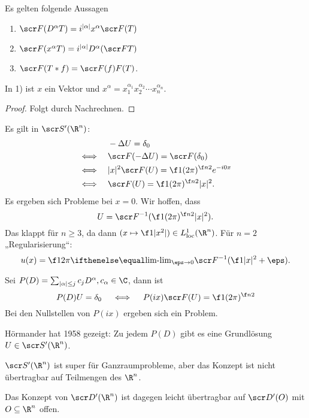 \begin{st} \label{5.60}
	Es gelten folgende Aussagen
	\begin{enumerate}[1)]
		\item
			$\scr F(D^\alpha T) = i^{|\alpha|} x^\alpha \scr F(T)$
		\item
			$\scr F(x^\alpha T) = i^{|\alpha|} D^\alpha (\scr FT)$
		\item
			$\scr F(T \ast f) = \scr F(f) F(T)$.
	\end{enumerate}
	\begin{note}
		In 1) ist $x$ ein Vektor und $x^\alpha = x_1^{\alpha_1} x_2^{\alpha_2} \dotsb x_n^{\alpha_n}$.
	\end{note}
	\begin{proof}
		Folgt durch Nachrechnen.
	\end{proof}
\end{st}

\begin{ex} \label{5.61}
	Es gilt in $\scr S'(\R^n)$:
	\begin{align*}
		&\quad - \Delta U = \delta_0 \\
		\iff&\quad \scr F(-\Delta U) = \scr F(\delta_0) \\
		\iff&\quad |x|^2 \scr F(U) = \f 1{(2\pi)^{\f n2}} e^{-i 0 x} \\
		\iff&\quad \scr F(U) = \f 1{(2\pi)^{\f n2} |x|^2}.
	\end{align*}
	Es ergeben sich Probleme bei $x = 0$.
	Wir hoffen, dass
	\[
		U = \scr F^{-1} ( \f 1{(2\pi)^{\f n2}|x|^2}).
	\]
	Das klappt für $n \ge 3$, da dann $(x\mapsto \f 1{|x^2|}) \in L^1_\text{loc}(\R^n)$.
	Für $n=2$ „Regularisierung“:
	\[
		u(x) = \f 1{2\pi} \lim_{\eps \to 0} \scr F^{-1} (\f 1{|x|^2 + \eps}).
	\]
\end{ex}

\begin{ex}[Grundlösung] \label{5.62}
	Sei $P(D) = \sum_{|\alpha|\le j} c_j D^\alpha, c_\alpha \in \C$, dann ist
	\[
		P(D) U = \delta_0
		\quad\iff\quad
		P(ix) \scr F(U) = \f 1{(2\pi)^{\f n2}}
	\]
	Bei den Nullstellen von $P(ix)$ ergeben sich ein Problem.

	Hörmander hat 1958 gezeigt: Zu jedem $P(D)$ gibt es eine Grundlösung $U \in \scr S'(\R^n)$.
\end{ex}

\begin{nt} \label{5.63}
	$\scr S'(\R^n)$ ist super für Ganzraumprobleme, aber das Konzept ist nicht übertragbar auf Teilmengen des $\R^n$.

	Das Konzept von $\scr D'(\R^n)$ ist dagegen leicht übertragbar auf $\scr D'(O)$ mit $O \subset \R^n$ offen.
\end{nt}
